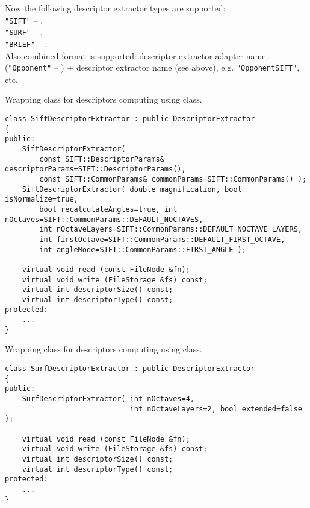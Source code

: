 
\begin{description}
\end{description}

Now the following descriptor extractor types are supported:\\
\texttt{"SIFT"} -- ,\\
\texttt{"SURF"} -- ,\\
\texttt{"BRIEF"} -- .\\
Also combined format is supported: descriptor extractor adapter name (\texttt{"Opponent"} -- 
) + descriptor extractor name (see above), 
e.g. \texttt{"OpponentSIFT"}, etc.

Wrapping class for descriptors computing using  class.

\begin{lstlisting}
class SiftDescriptorExtractor : public DescriptorExtractor
{
public:
    SiftDescriptorExtractor( 
        const SIFT::DescriptorParams& descriptorParams=SIFT::DescriptorParams(),
        const SIFT::CommonParams& commonParams=SIFT::CommonParams() );
    SiftDescriptorExtractor( double magnification, bool isNormalize=true, 
        bool recalculateAngles=true, int nOctaves=SIFT::CommonParams::DEFAULT_NOCTAVES,
        int nOctaveLayers=SIFT::CommonParams::DEFAULT_NOCTAVE_LAYERS,
        int firstOctave=SIFT::CommonParams::DEFAULT_FIRST_OCTAVE,
        int angleMode=SIFT::CommonParams::FIRST_ANGLE );

    virtual void read (const FileNode &fn);
    virtual void write (FileStorage &fs) const;
    virtual int descriptorSize() const;
    virtual int descriptorType() const;
protected:
    ...
}
\end{lstlisting}

Wrapping class for descriptors computing using  class.

\begin{lstlisting}
class SurfDescriptorExtractor : public DescriptorExtractor
{
public:
    SurfDescriptorExtractor( int nOctaves=4,
                             int nOctaveLayers=2, bool extended=false );

    virtual void read (const FileNode &fn);
    virtual void write (FileStorage &fs) const;
    virtual int descriptorSize() const;
    virtual int descriptorType() const;
protected:
    ...
}
\end{lstlisting}

